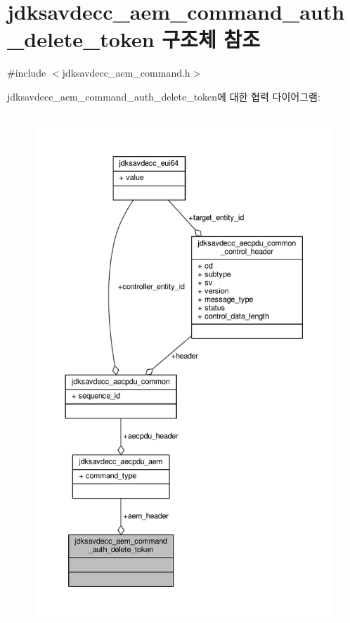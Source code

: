 \hypertarget{structjdksavdecc__aem__command__auth__delete__token}{}\section{jdksavdecc\+\_\+aem\+\_\+command\+\_\+auth\+\_\+delete\+\_\+token 구조체 참조}
\label{structjdksavdecc__aem__command__auth__delete__token}


{\ttfamily \#include $<$jdksavdecc\+\_\+aem\+\_\+command.\+h$>$}



jdksavdecc\+\_\+aem\+\_\+command\+\_\+auth\+\_\+delete\+\_\+token에 대한 협력 다이어그램\+:
\nopagebreak
\begin{figure}[H]
\begin{center}
\leavevmode
\includegraphics[height=550pt]{structjdksavdecc__aem__command__auth__delete__token__coll__graph}
\end{center}
\end{figure}
